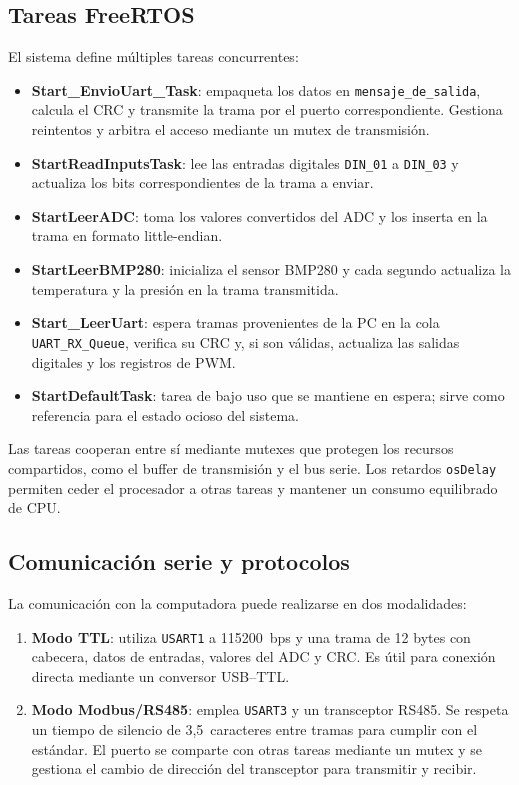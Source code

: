 \documentclass{article}
\begin{document}
\subsection{Tareas FreeRTOS}
El sistema define múltiples tareas concurrentes:
\begin{itemize}
  \item \textbf{Start\_EnvioUart\_Task}: empaqueta los datos en \texttt{mensaje\_de\_salida}, calcula el CRC y transmite la trama por el puerto correspondiente. Gestiona reintentos y arbitra el acceso mediante un mutex de transmisión.
  \item \textbf{StartReadInputsTask}: lee las entradas digitales \texttt{DIN\_01} a \texttt{DIN\_03} y actualiza los bits correspondientes de la trama a enviar.
  \item \textbf{StartLeerADC}: toma los valores convertidos del ADC y los inserta en la trama en formato little-endian.
  \item \textbf{StartLeerBMP280}: inicializa el sensor BMP280 y cada segundo actualiza la temperatura y la presión en la trama transmitida.
\item \textbf{Start\_LeerUart}: espera tramas provenientes de la PC en la cola \texttt{UART\_RX\_Queue}, verifica su CRC y, si son válidas, actualiza las salidas digitales y los registros de PWM.
\item \textbf{StartDefaultTask}: tarea de bajo uso que se mantiene en espera; sirve como referencia para el estado ocioso del sistema.
\end{itemize}

Las tareas cooperan entre sí mediante mutexes que protegen los recursos compartidos, como el buffer de transmisión y el bus serie. Los retardos \texttt{osDelay} permiten ceder el procesador a otras tareas y mantener un consumo equilibrado de CPU.

\subsection{Comunicación serie y protocolos}
La comunicación con la computadora puede realizarse en dos modalidades:
\begin{enumerate}
  \item \textbf{Modo TTL}: utiliza \texttt{USART1} a 115200~bps y una trama de 12 bytes con cabecera, datos de entradas, valores del ADC y CRC. Es útil para conexión directa mediante un conversor USB--TTL.
  \item \textbf{Modo Modbus/RS485}: emplea \texttt{USART3} y un transceptor RS485. Se respeta un tiempo de silencio de 3,5~caracteres entre tramas para cumplir con el estándar. El puerto se comparte con otras tareas mediante un mutex y se gestiona el cambio de dirección del transceptor para transmitir y recibir.
\end{enumerate}
\end{document}
